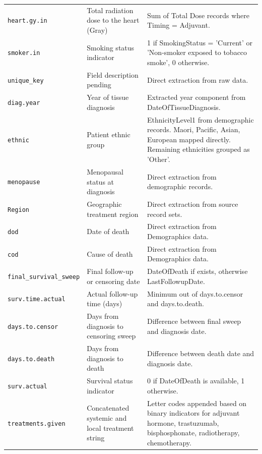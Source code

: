 \begin{landscape}
\begin{longtable}{p{} p{} p{}}
\texttt{heart.gy.in} & Total radiation dose to the heart (Gray) & Sum of Total Dose records where Timing = Adjuvant. \\
\texttt{smoker.in} & Smoking status indicator & 1 if SmokingStatus = 'Current' or 'Non-smoker exposed to tobacco smoke', 0 otherwise. \\
\texttt{unique\_key} & Field description pending & Direct extraction from raw data. \\
\texttt{diag.year} & Year of tissue diagnosis & Extracted year component from DateOfTissueDiagnosis. \\
\texttt{ethnic} & Patient ethnic group & EthnicityLevel1 from demographic records. Maori, Pacific, Asian, European mapped directly. Remaining ethnicities grouped as 'Other'. \\
\texttt{menopause} & Menopausal status at diagnosis & Direct extraction from demographic records. \\
\texttt{Region} & Geographic treatment region & Direct extraction from source record sets. \\
\texttt{dod} & Date of death & Direct extraction from Demographics data. \\
\texttt{cod} & Cause of death & Direct extraction from Demographics data. \\
\texttt{final\_survival\_sweep} & Final follow-up or censoring date & DateOfDeath if exists, otherwise LastFollowupDate. \\
\texttt{surv.time.actual} & Actual follow-up time (days) & Minimum out of days.to.censor and days.to.death. \\
\texttt{days.to.censor} & Days from diagnosis to censoring sweep & Difference between final sweep and diagnosis date. \\
\texttt{days.to.death} & Days from diagnosis to death & Difference between death date and diagnosis date. \\
\texttt{surv.actual} & Survival status indicator & 0 if DateOfDeath is available, 1 otherwise. \\
\texttt{treatments.given} & Concatenated systemic and local treatment string & Letter codes appended based on binary indicators for adjuvant hormone, trastuzumab, bisphosphonate, radiotherapy, chemotherapy. \\
\end{longtable}

\end{landscape}